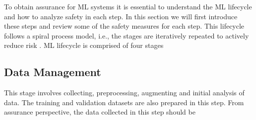 To obtain assurance for ML systems it is essential to understand the ML lifecycle and how to analyze safety in each step. In this section we will first introduce these steps and review some of the safety measures for each step. This lifecycle follows a spiral process model, i.e., the stages are iteratively repeated to actively reduce risk \cite{Boehm2000}. ML lifecycle is comprised of four stages \cite{Ashmore2021} 

\subsection{Data Management}
\label{sub:DM}
This stage involves collecting, preprocessing, augmenting and initial analysis of data. The training and validation datasets are also prepared in this step.
From assurance perspective, the data collected in this step should be

